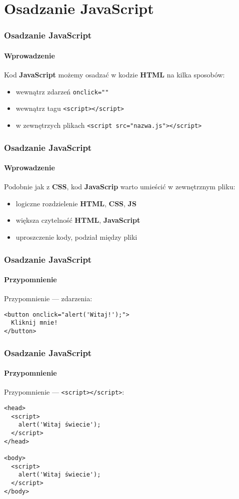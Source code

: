 \section{Osadzanie JavaScript}

\begin{frame}[fragile]
  \frametitle{Osadzanie JavaScript}
  \framesubtitle{Wprowadzenie}

  Kod \textbf{JavaScript} możemy osadzać w kodzie \textbf{HTML} na kilka sposobów:

  \begin{itemize}
    \item wewnątrz zdarzeń \verb|onclick=""|
    \item wewnątrz tagu \verb|<script></script>|
    \item w zewnętrzych plikach \verb|<script src="nazwa.js"></script>|
  \end{itemize}

\end{frame}


\begin{frame}[fragile]
  \frametitle{Osadzanie JavaScript}
  \framesubtitle{Wprowadzenie}

  Podobnie jak z \textbf{CSS}, kod \textbf{JavaScrip} warto umieścić w zewnętrznym pliku:

  \begin{itemize}
    \item logiczne rozdzielenie \textbf{HTML}, \textbf{CSS}, \textbf{JS}
    \item większa czytelność \textbf{HTML}, \textbf{JavaScript}
    \item uproszczenie kody, podział między pliki
  \end{itemize}

\end{frame}


\begin{frame}[fragile]
  \frametitle{Osadzanie JavaScript}
  \framesubtitle{Przypomnienie}

  Przypomnienie --- zdarzenia:

  \begin{verbatim}
<button onclick="alert('Witaj!');">
  Kliknij mnie!
</button>
  \end{verbatim}

\end{frame}


\begin{frame}[fragile]
  \frametitle{Osadzanie JavaScript}
  \framesubtitle{Przypomnienie}

  Przypomnienie --- \verb|<script></script>|:

  \begin{verbatim}
<head>
  <script>
    alert('Witaj świecie');
  </script>
</head>

<body>
  <script>
    alert('Witaj świecie');
  </script>
</body>
  \end{verbatim}

\end{frame}


